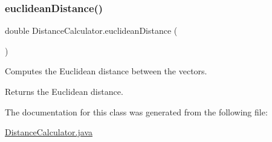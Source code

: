 \subsubsection{\texorpdfstring{euclidean\+Distance()}{euclideanDistance()}}
{\footnotesize\ttfamily double Distance\+Calculator.\+euclidean\+Distance (\begin{DoxyParamCaption}{ }\end{DoxyParamCaption})}

Computes the Euclidean distance between the vectors. \begin{DoxyReturn}{Returns}
the Euclidean distance. 
\end{DoxyReturn}


The documentation for this class was generated from the following file\+:\begin{DoxyCompactItemize}
\item 
\hyperlink{_distance_calculator_8java}{Distance\+Calculator.\+java}\end{DoxyCompactItemize}
